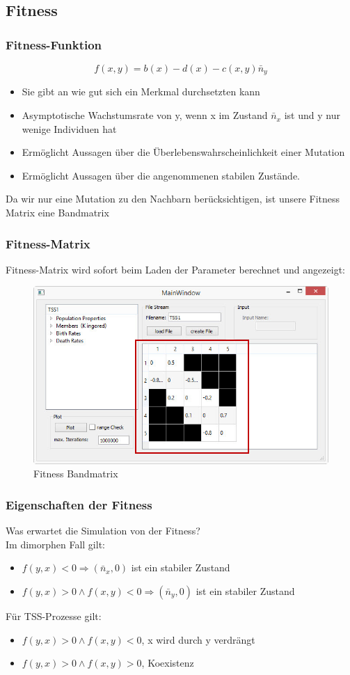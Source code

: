 \documentclass{beamer}
\begin{document}
	\subsection{Fitness}
		\begin{frame}
			\frametitle{Fitness-Funktion}
			\pause
			\[ f(x,y) = b(x) - d(x) - c(x,y)\bar{n}_y \]
			\pause
			\begin{itemize}
				\item Sie gibt an wie gut sich ein Merkmal durchsetzten kann
				\item Asymptotische Wachstumsrate von y, wenn x im Zustand $ \bar{n}_x $ ist und y nur wenige Individuen hat
				\item Ermöglicht Aussagen über die Überlebenswahrscheinlichkeit einer Mutation
				\item Ermöglicht Aussagen über die angenommenen stabilen Zustände.
			\end{itemize}
			\pause
			Da wir nur eine Mutation zu den Nachbarn berücksichtigen, ist unsere Fitness Matrix eine Bandmatrix
		\end{frame}
		\begin{frame}
			\frametitle{Fitness-Matrix}
			Fitness-Matrix wird sofort beim Laden der Parameter berechnet und angezeigt:
			\begin{figure}[H]
				\centering
				\includegraphics[width=0.7\linewidth]{./MainWindow_BandMatrix}
				\caption[Fitness Matrix]{Fitness Bandmatrix}
				\label{MainWindow mit Fitness Bandmatrix}
			\end{figure}
		\end{frame}
		\begin{frame}
			\frametitle{Eigenschaften der Fitness}
			Was erwartet die Simulation von der Fitness?\\
			\pause
			Im dimorphen Fall gilt:
			\begin{itemize}
				\item $ f(y,x) < 0 \Rightarrow (\bar{n}_x,0) $ ist ein stabiler Zustand
				\item $ f(y,x) > 0 \wedge f(x,y) < 0 \Rightarrow (\bar{n}_y,0) $ ist ein stabiler Zustand
			\end{itemize}
			\pause
			Für TSS-Prozesse gilt:
			\begin{itemize}
				\item $ f(y,x) > 0 \wedge f(x,y) < 0 $, x wird durch y verdrängt
				\item $ f(y,x) > 0 \wedge f(x,y) > 0 $, Koexistenz
			\end{itemize}
		\end{frame}	
\end{document}
